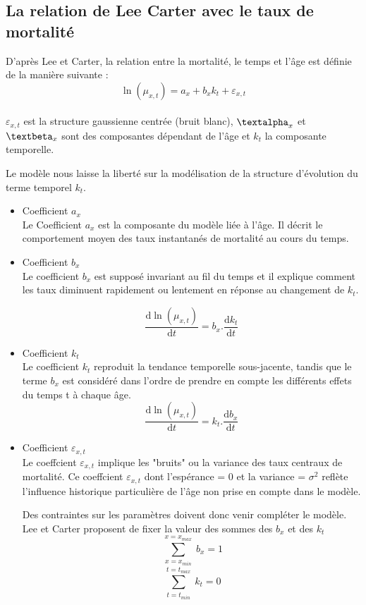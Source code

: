 \documentclass[french]{report}
\begin{document}
\subsection{La relation de Lee Carter avec le taux de mortalité}
D'après Lee et Carter, la relation entre la mortalité, le temps et l'âge est définie de la manière suivante : \cite{Lee Carter}\\
\[\ln(\mu_ {x,t}) = {a}_{x} + {b}_{x}k_{t}+\varepsilon_{x,t}\]
\\


  $\varepsilon_{x,t}$ est la structure gaussienne centrée (bruit blanc), $\textalpha_{x}$ et $\textbeta_{x}$ sont des composantes dépendant de l'âge et $k_{t}$ la composante temporelle. 
    
Le modèle nous laisse la liberté sur la modélisation de la structure d'évolution du terme temporel $k_{t}$.
\begin{itemize}

    \item Coefficient ${a}_{x}$ \\
Le Coefficient ${a}_{x}$ est la composante du modèle liée à l'âge. Il décrit le comportement moyen des taux instantanés de mortalité au cours du temps.
\\
    \item Coefficient ${b}_{x}$ \\
Le coefficient ${b}_{x}$ est supposé invariant
au fil du temps et il explique comment les taux diminuent rapidement ou lentement en réponse au changement de $k_{t}$.
\newcommand{\deriv}{\mathrm{d}}

    \[\frac{\deriv \ln(\mu_ {x,t})}{\deriv t} ={b}_{x}.\frac{\deriv k_{t}}{\deriv t}\]
    
    \item Coefficient $k_{t}$ \\
Le coefficient $k_{t}$ reproduit la tendance temporelle sous-jacente, tandis que le terme ${b}_{x}$ est considéré dans l'ordre
de prendre en compte les différents effets du temps t à chaque âge.
     \[\frac{\deriv \ln(\mu_ {x,t})}{\deriv t} =k_{t}.\frac{\deriv {b}_{x}}{\deriv t}\]
    \item Coefficient $\varepsilon_{x,t}$\\
Le coeffcient $\varepsilon_{x,t}$ implique les "bruits" ou la variance des taux centraux de mortalité. Ce coeffcient $\varepsilon_{x,t}$ dont l'espérance = 0 et la variance = $\sigma^2$  reflète l'influence historique particulière de l'âge non prise en compte dans
le modèle.

Des contraintes sur les paramètres doivent donc venir compléter le modèle. Lee et Carter proposent de fixer la valeur des sommes des ${b}_{x}$ et des $k_{t}$
\[\sum\limits_{\substack{x=x_{min}}}^{x=x_{max}} {b}_{x} = 1\]
\[\sum\limits_{\substack{t=t_{min}}}^{t=t_{max}} k_{t} = 0\]

\end{itemize}
\end{document}
